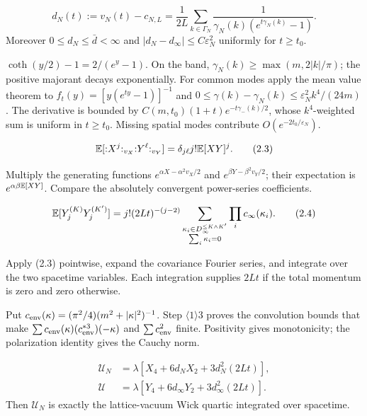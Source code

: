 \documentclass[11pt,a4paper]{article}
\newcommand{\eps}{\varepsilon}
\newcommand{\T}{\mathbb T}
\newcommand{\U}{\mathcal U}
\begin{document}
\[
 d_N(t):=v_N(t)-c_{N,L}
 =\frac1{2L}\sum_{k\in\Gamma_N}\frac1{\gamma_N(k)(e^{t\gamma_N(k)}-1)}.
\tag{2.2}
\]
Moreover $0\le d_N\le\bar d<\infty$ and
$|d_N-d_\infty|\le C\eps_N^2$ uniformly for $t\ge t_0$.

\Because $\coth(y/2)-1=2/(e^y-1)$.  On the band,
$\gamma_N(k)\ge\max(m,2|k|/\pi)$; the positive majorant decays exponentially.
For common modes apply the mean value theorem to
$f_t(y)=[y(e^{ty}-1)]^{-1}$ and
$0\le\gamma(k)-\gamma_N(k)\le\eps_N^2k^4/(24m)$.  The derivative is bounded by
$C(m,t_0)(1+t)e^{-t\gamma_-(k)/2}$, whose $k^4$-weighted sum is uniform in
$t\ge t_0$.  Missing spatial modes contribute $O(e^{-2t_0/\eps_N})$.

\[
 \mathbb E[{:}X^j{:}_{v_X}{:}Y^\ell{:}_{v_Y}]
 =\delta_{j\ell}j!\mathbb E[XY]^j.\tag{2.3}
\]

\Because Multiply the generating functions
$e^{\alpha X-\alpha^2v_X/2}$ and
$e^{\beta Y-\beta^2v_Y/2}$; their expectation is $e^{\alpha\beta\mathbb E[XY]}$.
Compare the absolutely convergent power-series coefficients.

\LS{2}{4}{Let $Y_j^{(K)}=\int_{\T_t\times\T_L}{:}\eta_K^j{:}$ for $j=2,4$.
Then}
\[
 \mathbb E[Y_j^{(K)}Y_j^{(K')}]
 =j!(2Lt)^{-(j-2)}
 \sum_{\substack{\kappa_i\in D_\infty^{\le K\wedge K'}\\\sum_i\kappa_i=0}}
 \prod_i c_\infty(\kappa_i).\tag{2.4}
\]

\Because Apply (2.3) pointwise, expand the covariance Fourier series, and integrate
over the two spacetime variables.  Each integration supplies $2Lt$ if the total
momentum is zero and zero otherwise.


\Because Put
$c_{\rm env}(\kappa)=(\pi^2/4)(m^2+|\kappa|^2)^{-1}$.  Step
$\langle1\rangle3$ proves the convolution bounds that make
$\sum c_{\rm env}(\kappa)(c_{\rm env}^{*3})(-\kappa)$ and
$\sum c_{\rm env}^2$ finite.  Positivity gives monotonicity; the polarization
identity gives the Cauchy norm.

\begin{align*}
 \U_N&=\lambda[X_4+6d_NX_2+3d_N^2(2Lt)],\\
 \U&=\lambda[Y_4+6d_\infty Y_2+3d_\infty^2(2Lt)].\tag{2.5}
\end{align*}
Then $\U_N$ is exactly the lattice-vacuum Wick quartic integrated over spacetime.
\end{document}
